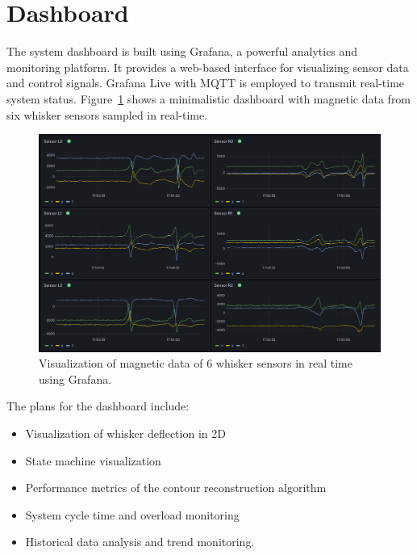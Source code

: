 \section{Dashboard}
The system dashboard is built using Grafana, a powerful analytics and monitoring platform.
It provides a web-based interface for visualizing sensor data and control signals.
Grafana Live with MQTT is employed to transmit real-time system status.
Figure~\ref{fig:grafana} shows a minimalistic dashboard with magnetic data from six whisker sensors sampled in real-time.


\begin{figure}[htb]
    \centering
    \includegraphics[width=\textwidth]{figures/grafana}
    \caption{Visualization of magnetic data of 6 whisker sensors in real time using Grafana.}
    \label{fig:grafana}
\end{figure}

The plans for the dashboard include:
\begin{itemize}
    \item Visualization of whisker deflection in 2D
    \item State machine visualization
    \item Performance metrics of the contour reconstruction algorithm
    \item System cycle time and overload monitoring
    \item Historical data analysis and trend monitoring.
\end{itemize}
